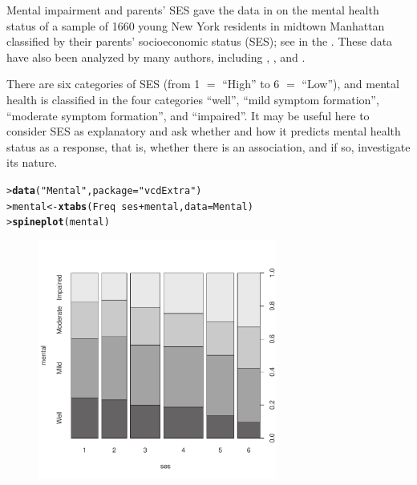 \documentclass[10pt,krantz2]{krantz}\usepackage[]{graphicx}\usepackage[]{color}
\makeatletter
\newcommand{\hlstr}[1]{\textcolor[rgb]{0.192,0.494,0.8}{#1}}%
\newcommand{\hlopt}[1]{\textcolor[rgb]{0,0,0}{#1}}%
\newcommand{\hlstd}[1]{\textcolor[rgb]{0.345,0.345,0.345}{#1}}%
\newcommand{\hlkwb}[1]{\textcolor[rgb]{0.69,0.353,0.396}{#1}}%
\newcommand{\hlkwc}[1]{\textcolor[rgb]{0.333,0.667,0.333}{#1}}%
\newcommand{\hlkwd}[1]{\textcolor[rgb]{0.737,0.353,0.396}{\textbf{#1}}}%
\newenvironment{kframe}{%
 \def\at@end@of@kframe{}%
 \ifinner\ifhmode%
  \def\at@end@of@kframe{\end{minipage}}%
  \begin{minipage}{\columnwidth}%
 \fi\fi%
 \def\FrameCommand##1{\hskip\@totalleftmargin \hskip-\fboxsep
 \colorbox{shadecolor}{##1}\hskip-\fboxsep
     \hskip-\linewidth \hskip-\@totalleftmargin \hskip\columnwidth}%
 \MakeFramed {\advance\hsize-\width
   \@totalleftmargin\z@ \linewidth\hsize
   \@setminipage}}%
 {\par\unskip\endMakeFramed%
 \at@end@of@kframe}
\newenvironment{knitrout}{}{} %
\renewenvironment{knitrout}{\small\renewcommand{\baselinestretch}{.85}}{} %
\makeatother
\begin{document}
\begin{Example}[mental1]{Mental impairment and parents' SES}
\citet[p. 289]{Srole-etal:78} gave the data
in  on the mental
health status of a sample of 1660 young New York residents in midtown Manhattan
classified by their parents' socioeconomic status (SES);
see  in the .
These data have also been analyzed by many authors, including
\citet[ \S 10.5.3]{Agresti:2013},
\citet{Goodman:79}, and
\citet[p. 375]{Haberman:79}.

There are six categories of SES (from 1 $=$ ``High'' to 6 $=$ ``Low''), and mental health is classified
in the four categories ``well'', ``mild symptom formation'',
``moderate symptom formation'', and ``impaired''.
It may be useful here to consider SES as explanatory
and ask whether and how it predicts mental health status as
a response, that is, whether there is an association, and if so, investigate
its nature.

\begin{knitrout}
\color{fgcolor}\begin{kframe}
\begin{alltt}
\hlstd{> }\hlkwd{data}\hlstd{(}\hlstr{"Mental"}\hlstd{,} \hlkwc{package} \hlstd{=} \hlstr{"vcdExtra"}\hlstd{)}
\hlstd{> }\hlstd{mental} \hlkwb{<-} \hlkwd{xtabs}\hlstd{(Freq} \hlopt{~} \hlstd{ses} \hlopt{+} \hlstd{mental,} \hlkwc{data} \hlstd{= Mental)}
\hlstd{> }\hlkwd{spineplot}\hlstd{(mental)}
\end{alltt}
\end{kframe}\begin{figure}[!htbp]

\centerline{\includegraphics[width=0.7\textwidth]{ch04/fig/spineplot-1} }


\end{figure}
\end{knitrout}
\end{Example}
\end{document}
